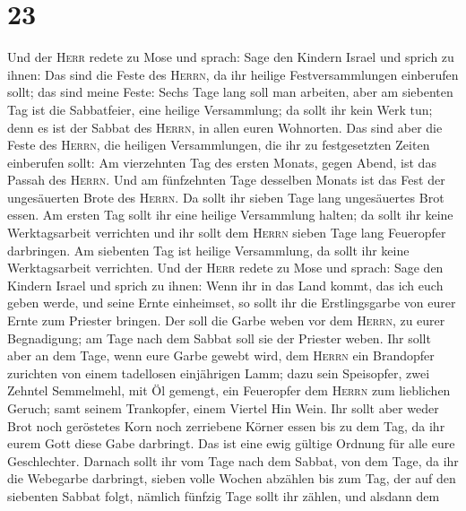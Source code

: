 \hypertarget{section-22}{%
\section{23}\label{section-22}}

 Und der \textsc{Herr} redete zu Mose und sprach: Sage den
Kindern Israel und sprich zu ihnen:  Das sind die Feste
des \textsc{Herrn}, da ihr heilige Festversammlungen einberufen sollt;
das sind meine Feste:  Sechs Tage lang soll man arbeiten,
aber am siebenten Tag ist die Sabbatfeier, eine heilige Versammlung; da
sollt ihr kein Werk tun; denn es ist der Sabbat des \textsc{Herrn}, in
allen euren Wohnorten.  Das sind aber die Feste des
\textsc{Herrn}, die heiligen Versammlungen, die ihr zu festgesetzten
Zeiten einberufen sollt:  Am vierzehnten Tag des ersten
Monats, gegen Abend, ist das Passah des \textsc{Herrn}. 
Und am fünfzehnten Tage desselben Monats ist das Fest der ungesäuerten
Brote des \textsc{Herrn}. Da sollt ihr sieben Tage lang ungesäuertes
Brot essen.  Am ersten Tag sollt ihr eine heilige
Versammlung halten;  da sollt ihr keine Werktagsarbeit
verrichten und ihr sollt dem \textsc{Herrn} sieben Tage lang Feueropfer
darbringen. Am siebenten Tag ist heilige Versammlung, da sollt ihr keine
Werktagsarbeit verrichten.  Und der \textsc{Herr} redete
zu Mose und sprach:  Sage den Kindern Israel und sprich
zu ihnen: Wenn ihr in das Land kommt, das ich euch geben werde, und
seine Ernte einheimset, so sollt ihr die Erstlingsgarbe von eurer Ernte
zum Priester bringen.  Der soll die Garbe weben vor dem
\textsc{Herrn}, zu eurer Begnadigung; am Tage nach dem Sabbat soll sie
der Priester weben.  Ihr sollt aber an dem Tage, wenn
eure Garbe gewebt wird, dem \textsc{Herrn} ein Brandopfer zurichten von
einem tadellosen einjährigen Lamm;  dazu sein Speisopfer,
zwei Zehntel Semmelmehl, mit Öl gemengt, ein Feueropfer dem
\textsc{Herrn} zum lieblichen Geruch; samt seinem Trankopfer, einem
Viertel Hin Wein.  Ihr sollt aber weder Brot noch
geröstetes Korn noch zerriebene Körner essen bis zu dem Tag, da ihr
eurem Gott diese Gabe darbringt. Das ist eine ewig gültige Ordnung für
alle eure Geschlechter.  Darnach sollt ihr vom Tage nach
dem Sabbat, von dem Tage, da ihr die Webegarbe darbringt, sieben volle
Wochen abzählen bis zum Tag,  der auf den siebenten
Sabbat folgt, nämlich fünfzig Tage sollt ihr zählen, und alsdann dem
